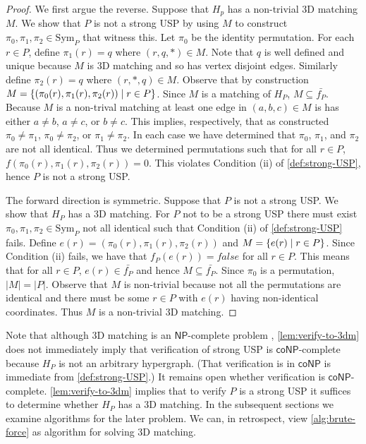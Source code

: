 \documentclass[11pt]{article}
\newcommand\sse{\subseteq}
\newcommand\Sym[1]{\ensuremath{\mathrm{Sym}_{#1}}}
\newcommand\condset[2]{\set{#1 \;|\; #2}}
\renewcommand\NP{\ensuremath{\mathsf{NP}}}
\newcommand\coNP{\ensuremath{\mathsf{coNP}}}
\begin{document}
\begin{proof}
  We first argue the reverse.  Suppose that $H_p$ has a
  non-trivial 3D matching $M$.  We show that $P$ is not a strong USP by
  using $M$ to construct $\pi_0, \pi_1, \pi_2 \in \Sym{P}$ that
  witness this.  Let $\pi_0$ be the identity permutation.  For each $r
  \in P$, define $\pi_1(r) = q$ where $(r,q,*) \in M$.  Note that $q$
  is well defined and unique because $M$ is 3D matching and so has
  vertex disjoint edges.  Similarly define $\pi_2(r) = q$ where
  $(r,*,q) \in M$.  Observe that by construction $M =
  \condset{(\pi_0(r),\pi_1(r),\pi_2(r))}{r \in P}$.  Since $M$ is a
  matching of $H_P$, $M \sse \bar{f_P}$.  Because $M$ is a non-trival
  matching at least one edge in $(a,b,c) \in M$ is has either $a \neq
  b$, $a \neq c$, or $b \neq c$.  This implies, respectively, that as
  constructed $\pi_0 \neq \pi_1$, $\pi_0 \neq \pi_2$, or $\pi_1 \neq
  \pi_2$.  In each case we have determined that $\pi_0$, $\pi_1$, and
  $\pi_2$ are not all identical.  Thus we determined permutations such
  that for all $r \in P$, $f(\pi_0(r), \pi_1(r), \pi_2(r)) = 0$.  This
  violates Condition (ii) of \autoref{def:strong-USP}, hence $P$ is not a
  strong USP.

  The forward direction is symmetric.  Suppose
  that $P$ is not a strong USP. We show that $H_P$ has a 3D matching.
  For $P$ not to be a strong USP there must exist $\pi_0, \pi_1, \pi_2
  \in \Sym{P}$ not all identical such that Condition (ii) of
  \autoref{def:strong-USP} fails.  Define $e(r) =
  (\pi_0(r),\pi_1(r),\pi_2(r))$ and $M = \condset{e(r)}{r \in P}$.
  Since Condition (ii) fails, we have that $f_P(e(r)) = false$ for all $r
  \in P$.  This means that for all $r \in P$, $e(r) \in \bar{f_P}$ and
  hence $M \sse \bar{f_P}$.  Since $\pi_0$ is a permutation, $|M| =
  |P|$.  Observe that $M$ is non-trivial because not all 
  the permutations are identical and there must be some $r \in P$ with
  $e(r)$ having non-identical coordinates.  Thus $M$ is a non-trivial
  3D matching.
\end{proof}

Note that although 3D matching is an \NP-complete problem \cite{gj79},
\autoref{lem:verify-to-3dm} does not immediately imply that
verification of strong USP is \coNP-complete because $H_P$ is not an
arbitrary hypergraph.  (That verification is in \coNP{} is immediate
from \autoref{def:strong-USP}.)
It remains open whether verification is
\coNP-complete.
\autoref{lem:verify-to-3dm} implies that to verify $P$ is a strong USP
it suffices to determine whether $H_P$ has a 3D matching.  In the
subsequent sections we examine algorithms for the later problem.  We
can, in retrospect, view \autoref{alg:brute-force} as algorithm for solving 3D
matching.
\end{document}
